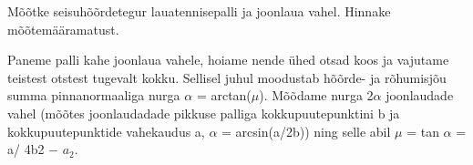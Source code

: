 
Mõõtke seisuhõõrdetegur lauatennisepalli ja joonlaua vahel. Hinnake mõõtemääramatust.

\hint

\solu
Paneme palli kahe joonlaua vahele, hoiame nende ühed otsad koos ja vajutame teistest otstest tugevalt kokku. Sellisel juhul moodustab hõõrde- ja rõhumisjõu summa pinnanormaaliga nurga $\alpha$ = arctan($\mu$). Mõõdame nurga 2$\alpha$ joonlaudade vahel (mõõtes joonlaudadade pikkuse palliga kokkupuutepunktini b ja kokkupuutepunktide vahekaudus a, $\alpha$ = arcsin(a/2b)) ning selle abil $\mu$ = tan $\alpha$ = a/ 4b2 $-$ $a_2$.
\probend
